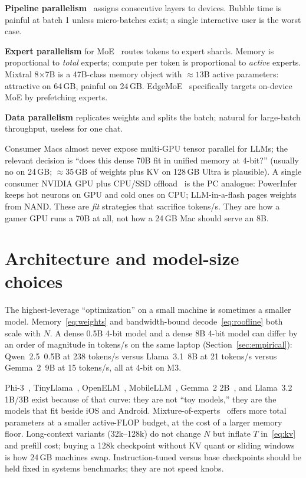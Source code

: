 \textbf{Pipeline parallelism}~\citep{huang2019gpipe} assigns consecutive layers to devices. Bubble time is painful at batch 1 unless micro-batches exist; a single interactive user is the worst case.

\textbf{Expert parallelism} for MoE~\citep{fedus2022switch,lepikhin2021gshard,jiang2024mixtral} routes tokens to expert shards. Memory is proportional to \emph{total} experts; compute per token is proportional to \emph{active} experts. Mixtral 8\(\times\)7B is a 47B-class memory object with \(\approx 13\)B active parameters: attractive on 64\,GB, painful on 24\,GB. EdgeMoE~\citep{yi2023edgemoe} specifically targets on-device MoE by prefetching experts.

\textbf{Data parallelism} replicates weights and splits the batch; natural for large-batch throughput, useless for one chat.

Consumer Macs almost never expose multi-GPU tensor parallel for LLMs; the relevant decision is ``does this dense 70B fit in unified memory at 4-bit?'' (usually no on 24\,GB; \(\approx 35\)\,GB of weights plus KV on 128\,GB Ultra is plausible). A single consumer NVIDIA GPU plus CPU/SSD offload~\citep{sheng2023flexgen,song2024powerinfer,alizadeh2024llm} is the PC analogue: PowerInfer keeps hot neurons on GPU and cold ones on CPU; LLM-in-a-flash pages weights from NAND. These are \emph{fit} strategies that sacrifice tokens/s. They are how a gamer GPU runs a 70B at all, not how a 24\,GB Mac should serve an 8B.

\section{Architecture and model-size choices}
\label{sec:arch}

The highest-leverage ``optimization'' on a small machine is sometimes a smaller model. Memory~\eqref{eq:weights} and bandwidth-bound decode~\eqref{eq:roofline} both scale with \(N\). A dense 0.5B 4-bit model and a dense 8B 4-bit model can differ by an order of magnitude in tokens/s on the same laptop (Section~\ref{sec:empirical}): Qwen~2.5~0.5B at 238 tokens/s versus Llama~3.1~8B at 21 tokens/s versus Gemma~2~9B at 15 tokens/s, all at 4-bit on M3.

Phi-3~\citep{abdin2024phi3}, TinyLlama~\citep{zhang2024tinyllama}, OpenELM~\citep{mehta2024openelm}, MobileLLM~\citep{liu2024mobilellm}, Gemma~2 2B~\citep{team2024gemma2}, and Llama~3.2 1B/3B exist because of that curve: they are not ``toy models,'' they are the models that fit beside iOS and Android. Mixture-of-experts~\citep{jiang2024mixtral,liu2024deepseek} offers more total parameters at a smaller active-FLOP budget, at the cost of a larger memory floor. Long-context variants (32k--128k) do not change \(N\) but inflate \(T\) in~\eqref{eq:kv} and prefill cost; buying a 128k checkpoint without KV quant or sliding windows is how 24\,GB machines swap. Instruction-tuned versus base checkpoints should be held fixed in systems benchmarks; they are not speed knobs.

